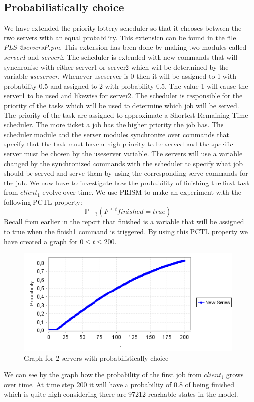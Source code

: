 \documentclass[12pt]{report}
\begin{document}
\subsection*{Probabilistically choice}
We have extended the priority lottery scheduler so that it chooses between the two servers with an equal probability. This extension can be found in the file \emph{PLS-2serversP.pm}. This extension has been done by making two modules called \emph{server1} and \emph{server2}. The scheduler is extended with new commands that will synchronise with either server1 or server2 which will be determined by the variable \emph{useserver}. Whenever useserver is 0 then it will be assigned to 1 with probability 0.5 and assigned to 2 with probability 0.5. The value 1 will cause the server1 to be used and likewise for server2. The scheduler is responsible for the priority of the tasks which will be used to determine which job will be served. The priority of the task are assigned to approximate a Shortest Remaining Time scheduler. The more ticket a job has the higher priority the job has. The scheduler module and the server modules synchronize over commands that specify that the task must have a high priority to be served and the specific server must be chosen by the useserver variable. The servers will use a variable changed by the synchronized commands with the scheduler to specify what job should be served and serve them by using the corresponding serve commands for the job. We now have to investigate how the probability of finishing the first task from $client_1$ evolve over time. We use PRISM to make an experiment with the following PCTL property:
$$\mathbb{P}_{=?}( F^{\leq t} finished=true)$$
Recall from earlier in the report that finished is a variable that will be assigned to true when the finish1 command is triggered. By using this PCTL property we have created a graph for $0 \leq t \leq 200$.
\begin{figure}[H]
	\begin{center}
		\includegraphics[scale=0.75]{../GFX/C1.png}
	\end{center}
	\caption{Graph for 2 servers with probabilistically choice}
\end{figure}
We can see by the graph how the probability of the first job from $client_1$ grows over time. At time step 200 it will have a probability of 0.8 of being finished which is quite high considering there are 97212 reachable states in the model.
\end{document}
